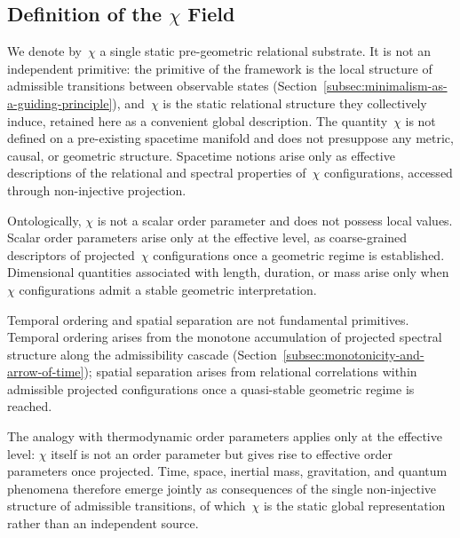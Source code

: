 \subsection{Definition of the \texorpdfstring{$\chi$}{χ} Field}
  \label{subsec:definition-of-the-chi-field}

  We denote by~$\chi$ a single static pre-geometric relational substrate.
  It is not an independent primitive: the primitive of the framework is the local
  structure of admissible transitions between observable states
  (Section~\ref{subsec:minimalism-as-a-guiding-principle}), and~$\chi$ is the static
  relational structure they collectively induce, retained here as a convenient
  global description.
  The quantity~$\chi$ is not defined on a pre-existing spacetime manifold and
  does not presuppose any metric, causal, or geometric structure.
  Spacetime notions arise only as effective descriptions of the relational and
  spectral properties of~$\chi$ configurations, accessed through non-injective
  projection.

  Ontologically, $\chi$ is not a scalar order parameter and does not possess
  local values.
  Scalar order parameters arise only at the effective level, as coarse-grained
  descriptors of projected~$\chi$ configurations once a geometric regime is
  established.
  Dimensional quantities associated with length, duration, or mass arise only
  when $\chi$ configurations admit a stable geometric interpretation.

  Temporal ordering and spatial separation are not fundamental primitives.
  Temporal ordering arises from the monotone accumulation of projected spectral
  structure along the admissibility cascade
  (Section~\ref{subsec:monotonicity-and-arrow-of-time}); spatial separation
  arises from relational correlations within admissible projected configurations
  once a quasi-stable geometric regime is reached.

  The analogy with thermodynamic order parameters applies only at the effective
  level: $\chi$ itself is not an order parameter but gives rise to effective
  order parameters once projected.
  Time, space, inertial mass, gravitation, and quantum phenomena therefore emerge
  jointly as consequences of the single non-injective structure of admissible
  transitions, of which~$\chi$ is the static global representation rather than an
  independent source.

